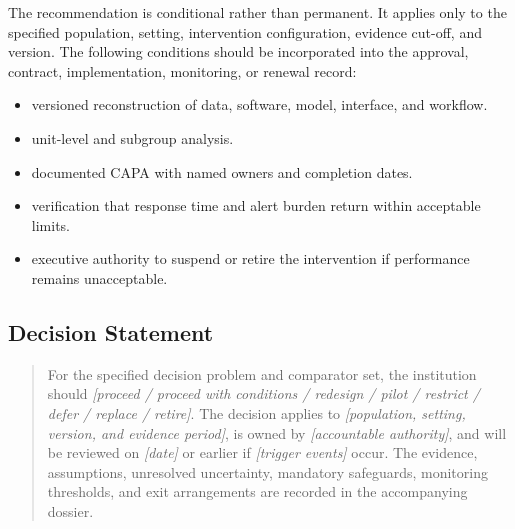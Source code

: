 The recommendation is conditional rather than permanent. It applies only to the
specified population, setting, intervention configuration, evidence cut-off, and
version. The following conditions should be incorporated into the approval,
contract, implementation, monitoring, or renewal record:

\begin{itemize}
 \item versioned reconstruction of data, software, model, interface, and workflow.
 \item unit-level and subgroup analysis.
 \item documented CAPA with named owners and completion dates.
 \item verification that response time and alert burden return within acceptable limits.
 \item executive authority to suspend or retire the intervention if performance remains unacceptable.
\end{itemize}

\subsection{Decision Statement}
\begin{quote}
For the specified decision problem and comparator set, the institution should
\emph{[proceed / proceed with conditions / redesign / pilot / restrict / defer /
replace / retire]}. The decision applies to \emph{[population, setting, version,
and evidence period]}, is owned by \emph{[accountable authority]}, and will be
reviewed on \emph{[date]} or earlier if \emph{[trigger events]} occur. The
evidence, assumptions, unresolved uncertainty, mandatory safeguards, monitoring
thresholds, and exit arrangements are recorded in the accompanying dossier.
\end{quote}
